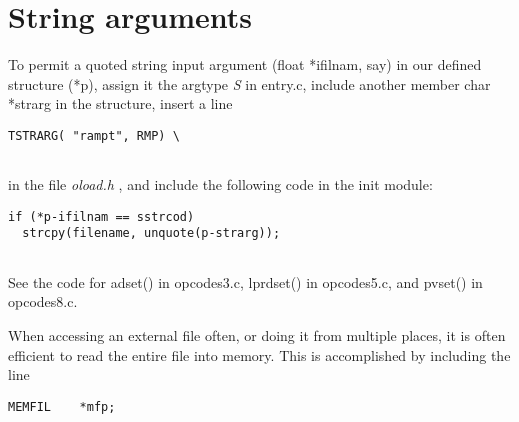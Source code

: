 \begin{comment}
\documentclass[10pt]{article}
\usepackage{fullpage, graphicx, url}
\setlength{\parskip}{1ex}
\setlength{\parindent}{0ex}
\title{String arguments}



\begin{tabular}{ccc}
The Alternative Csound Reference Manual & & \\
Previous &Adding your own Cmodules to Csound &Next

\end{tabular}

\end{comment}
\section{String arguments}


  To permit a quoted string input argument (float *ifilnam, say) in our defined structure (*p), assign it the argtype \emph{S}
 in entry.c, include another member char *strarg in the structure, insert a line 


 
\begin{lstlisting}
TSTRARG( "rampt", RMP) \
        
\end{lstlisting}


 


  in the file \emph{oload.h}
, and include the following code in the init module: 


 
\begin{lstlisting}
if (*p-ifilnam == sstrcod)
  strcpy(filename, unquote(p-strarg));
        
\end{lstlisting}


 


  See the code for adset() in opcodes3.c, lprdset() in opcodes5.c, and pvset() in opcodes8.c. 


  When accessing an external file often, or doing it from multiple places, it is often efficient to read the entire file into memory. This is accomplished by including the line 


 
\begin{lstlisting}
MEMFIL    *mfp;
        
\end{lstlisting}


